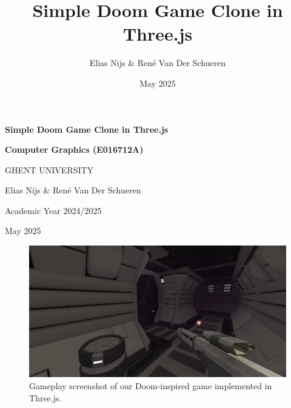 \documentclass{article}
\title{Simple Doom Game Clone in Three.js}
\author{Elias Nijs \& René Van Der Schueren}
\date{May 2025}
\newcommand{\courseinfo}{Computer Graphics (E016712A)}
\newcommand{\academicyear}{Academic Year 2024/2025}
\newcommand{\university}{GHENT UNIVERSITY}
\begin{document}
\begin{titlepage}
    \centering
    \vspace*{1cm}
    
    \Huge
    \textbf{Simple Doom Game Clone in Three.js}\\
    \vspace{1.5cm}
    
    \Large
    \textbf{\courseinfo}\\
    \vspace{0.5cm}
    
    \large
    \university\\
    \vspace{0.5cm}
    
    \vspace{1.5cm}
    
    \Large
    Elias Nijs \& René Van Der Schueren\\
    \vspace{0.5cm}
    
    \large
    \academicyear\\
    \vspace{0.5cm}
    
    \large
    May 2025\\
    
\end{titlepage}

\pagebreak

\tableofcontents

\pagebreak

\begin{figure}[H]
    \centering
    \includegraphics[width=\textwidth]{diagrams/gameplay.png}
    \caption{Gameplay screenshot of our Doom-inspired game implemented in Three.js.}
    \label{fig:gameplay-main}
\end{figure}
\end{document}
